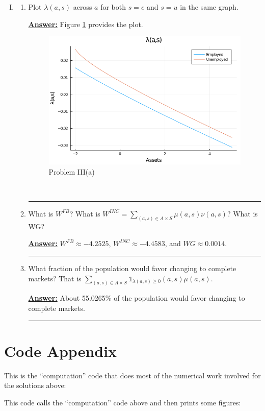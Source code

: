 \documentclass{article} %
\newcommand{\ifn}{\mathds{1}}
\theoremstyle{definition}
\newenvironment{solution}[1][Answer]{\begin{singlespace}\underline{\textbf{#1:}}\quad }{\ \rule{0.3em}{0.3em}\end{singlespace}} %
\begin{document}
\begin{enumerate}[I.]
		\item
		\begin{enumerate}
			\item Plot $ \lambda(a,s) $ across $ a $ for both $ s = e $ and $ s = u $ in the same graph.
			\begin{solution}
				Figure \ref{IIIa} provides the plot.
				\begin{figure}[htbp!]
					\centering
					\includegraphics[scale=.5]{ForIncludingInDocument/Lambda.png}
					\caption{Problem III(a) \label{IIIa}}
				\end{figure}
			\end{solution}
			\item What is $ W^{FB} $? What is $ W^{INC}  = \sum_{(a,s) \in A \times S} \mu(a,s) \nu(a,s) $? What is WG?
			\begin{solution}
				$ W^{FB}\approx-4.2525$,  $ W^{INC}  \approx -4.4583$, and $WG\approx 0.0014$.
			\end{solution}
			\item What fraction of the population would favor changing to complete markets? That is $   \sum_{(a,s) \in A \times S}   \ifn_{\lambda(a,s) \geq 0}  (a,s) \mu(a,s) $.
			\begin{solution}
				About 55.0265\% of the population would favor changing to complete markets.
			\end{solution}
		\end{enumerate}
	\end{enumerate}
\section*{Code Appendix}
This is the ``computation'' code that does most of the numerical work involved for the solutions above:

This code calls the ``computation'' code above and then prints some figures:
\end{document}

